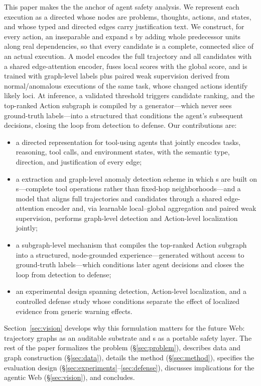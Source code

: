 This paper makes the \aeu{} the anchor of agent safety analysis. We represent each execution as a directed \stg{} whose nodes are problems, thoughts, actions, and states, and whose typed and directed edges carry justification text. We construct, for every action, an inseparable \aeu{} and expand \csg{}s by adding whole predecessor units along real dependencies, so that every candidate is a complete, connected slice of an actual execution. A \csmil{} model encodes the full trajectory and all candidates with a shared edge-attention encoder, fuses local scores with the global score, and is trained with graph-level labels plus paired weak supervision derived from normal/anomalous executions of the same task, whose changed actions identify likely loci. At inference, a validated threshold triggers candidate ranking, and the top-ranked Action subgraph is compiled by a generator---which never sees ground-truth labels---into a structured \sexp{} that conditions the agent's subsequent decisions, closing the loop from detection to defense. Our contributions are:
\begin{itemize}
  \item a directed \stg{} representation for tool-using agents that jointly encodes tasks, reasoning, tool calls, and environment states, with the semantic type, direction, and justification of every edge;
  \item a \csg{} extraction and graph-level anomaly detection scheme in which \csg{}s are built on \aeu{}s---complete tool operations rather than fixed-hop neighborhoods---and a \csmil{} model that aligns full trajectories and candidates through a shared edge-attention encoder and, via learnable local--global aggregation and paired weak supervision, performs graph-level detection and Action-level localization jointly;
  \item a subgraph-level \sexp{} mechanism that compiles the top-ranked Action subgraph into a structured, node-grounded experience---generated without access to ground-truth labels---which conditions later agent decisions and closes the loop from detection to defense;
  \item an experimental design spanning detection, Action-level localization, and a controlled defense study whose conditions separate the effect of localized evidence from generic warning effects.
\end{itemize}
Section~\ref{sec:vision} develops why this formulation matters for the future Web: trajectory graphs as an auditable substrate and \sexp{}s as a portable safety layer. The rest of the paper formalizes the problem (\S\ref{sec:problem}), describes data and graph construction (\S\ref{sec:data}), details the method (\S\ref{sec:method}), specifies the evaluation design (\S\ref{sec:experiments}--\ref{sec:defense}), discusses implications for the agentic Web (\S\ref{sec:vision}), and concludes.
